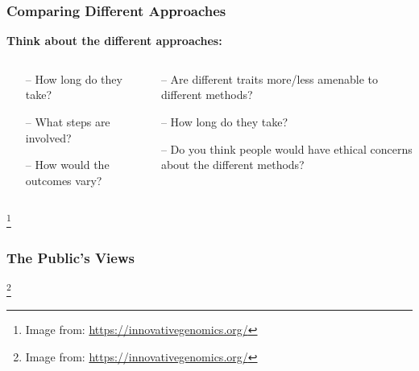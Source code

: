 \documentclass[xcolor=dvipsnames]{beamer}
\newcommand\blfootnote[1]{%
	\begingroup
	\renewcommand\thefootnote{}\footnote{#1}%
	\addtocounter{footnote}{-1}%
	\endgroup
}
\begin{document}
\begin{frame}
	\frametitle{Comparing Different Approaches}
			\textbf{Think about the different approaches:}
\begin{columns}
	\begin{column}{0.5\textwidth}
\begin{itemize}
	\item[--] How long do they take?
	\item[--] What steps are involved?
	\item[--] How would the outcomes vary?
	
\end{itemize}

	\end{column}
	\begin{column}{0.5\textwidth}
\begin{itemize}
	\item[--] Are different traits more/less amenable to different methods?
	\item[--] How long do they take?
	\item[--] Do you think people would have ethical concerns about the different methods?
\end{itemize}

	\end{column}
\end{columns}


\blfootnote{Image from: \url{https://innovativegenomics.org/}}
	
\end{frame}


\begin{frame}
	\frametitle{The Public's Views}
	
	\blfootnote{Image from: \url{https://innovativegenomics.org/}}
\end{frame}
\end{document}
